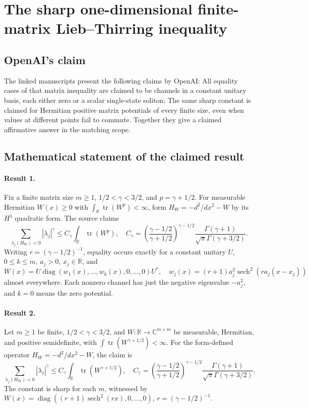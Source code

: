 \documentclass[11pt]{article}
\begin{document}
\section*{The sharp one-dimensional finite-matrix Lieb–Thirring inequality}

\subsection{OpenAI's claim}
The linked manuscripts present the following claims by OpenAI: All equality cases of that matrix inequality are claimed to be channels in a constant unitary basis, each either zero or a scalar single-state soliton; The same sharp constant is claimed for Hermitian positive matrix potentials of every finite size, even when values at different points fail to commute. Together they give a claimed affirmative answer in the matching scope.

\subsection{Mathematical statement of the claimed result}
\paragraph{Result 1.} Fix a finite matrix size \(m\ge1\), \(1/2<\gamma<3/2\), and \(p=\gamma+1/2\). For measurable Hermitian \(W(x)\ge0\) with \(\int_{\mathbb R}\operatorname{tr}(W^p)<\infty\), form \(H_W=-d^2/dx^2-W\) by its \(H^1\) quadratic form. The source claims
\[
 \sum_{\lambda_j(H_W)<0}|\lambda_j|^\gamma
 \le C_\gamma\int_{\mathbb R}\operatorname{tr}(W^p),\quad
 C_\gamma=\left(\frac{\gamma-1/2}{\gamma+1/2}\right)^{\gamma-1/2}
 \frac{\Gamma(\gamma+1)}{\sqrt\pi\Gamma(\gamma+3/2)}.
\]
Writing \(r=(\gamma-1/2)^{-1}\), equality occurs exactly for a constant unitary \(U\), \(0\le k\le m\), \(a_j>0\), \(x_j\in\mathbb R\), and
\[
 W(x)=U\operatorname{diag}(w_1(x),\ldots,w_k(x),0,\ldots,0)U^*,\quad
 w_j(x)=(r+1)a_j^2\operatorname{sech}^2(ra_j(x-x_j))
\]
almost everywhere. Each nonzero channel has just the negative eigenvalue \(-a_j^2\), and \(k=0\) means the zero potential.

\paragraph{Result 2.} Let \(m\ge1\) be finite, \(1/2<\gamma<3/2\), and \(W:\mathbb R\to\mathbb C^{m\times m}\) be measurable, Hermitian, and positive semidefinite, with \(\int\operatorname{tr}(W^{\gamma+1/2})<\infty\). For the form-defined operator \(H_W=-d^2/dx^2-W\), the claim is
\[
 \sum_{\lambda_j(H_W)<0}|\lambda_j|^\gamma\le C_\gamma\int_{\mathbb R}\operatorname{tr}(W^{\gamma+1/2}),\quad
 C_\gamma=\left(\frac{\gamma-1/2}{\gamma+1/2}\right)^{\gamma-1/2}
 \frac{\Gamma(\gamma+1)}{\sqrt\pi\Gamma(\gamma+3/2)}.
\]
The constant is sharp for each \(m\), witnessed by \(W(x)=\operatorname{diag}((r+1)\operatorname{sech}^2(rx),0,\ldots,0)\), \(r=(\gamma-1/2)^{-1}\).
\end{document}
